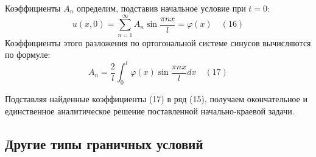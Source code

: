 Коэффициенты $A_n$ определим, подставив начальное условие при $t=0$:
\begin{equation}
	u(x,0) = \sum_{n=1}^{\infty} A_n \sin \frac{\pi n x}{l} = \varphi(x) \quad (16)
\end{equation}
Коэффициенты этого разложения по ортогональной системе синусов вычисляются по формуле:
\begin{equation}
	A_n = \frac{2}{l} \int_0^l \varphi(x) \sin \frac{\pi n x}{l} dx \quad (17)
\end{equation}

Подставляя найденные коэффициенты (17) в ряд (15), получаем окончательное и единственное аналитическое решение поставленной начально-краевой задачи.

\subsection{Другие типы граничных условий}

